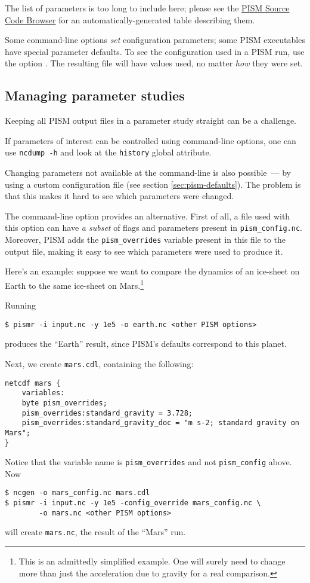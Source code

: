 The list of parameters is too long to include here; please see the \href{http://www.pism-docs.org/doxy/html/index.html}{PISM Source Code Browser} for an automatically-generated table describing them.

Some command-line options \emph{set} configuration parameters; some PISM
executables have special parameter defaults. To see the configuration used in a
PISM run, use the option . The resulting file will have values
used, no matter \emph{how} they were set.

\subsection{Managing parameter studies}
\label{sec:parameter-studies}
Keeping all PISM output files in a parameter study straight can be a challenge.

If parameters of interest can be controlled using command-line options, one can use \texttt{ncdump -h} and look at the \texttt{history} global attribute.

Changing parameters not available at the command-line is also possible~--- by using a custom configuration file (see section \ref{sec:pism-defaults}). The problem is that this makes it hard to see which parameters were changed.

The  command-line option provides an alternative. First of all, a file used with this option can have \emph{a subset} of flags and parameters present in \texttt{pism_config.nc}. Moreover, PISM adds the \texttt{pism_overrides} variable present in this file to the output file, making it easy to see which parameters were used to produce it.

Here's an example: suppose we want to compare the dynamics of an ice-sheet on Earth to the same ice-sheet on Mars.\footnote{This is an admittedly simplified example. One will surely need to change more than just the acceleration due to gravity for a real comparison.}

Running
\begin{verbatim}
$ pismr -i input.nc -y 1e5 -o earth.nc <other PISM options>
\end{verbatim}
produces the ``Earth'' result, since PISM's defaults correspond to this planet.

Next, we create \texttt{mars.cdl}, containing the following:
\small
\begin{verbatim}
netcdf mars {
    variables:
    byte pism_overrides;
    pism_overrides:standard_gravity = 3.728;
    pism_overrides:standard_gravity_doc = "m s-2; standard gravity on Mars";
}
\end{verbatim}
\normalsize
Notice that the variable name is \texttt{pism_overrides} and not \texttt{pism_config} above. Now
\begin{verbatim}
$ ncgen -o mars_config.nc mars.cdl
$ pismr -i input.nc -y 1e5 -config_override mars_config.nc \
        -o mars.nc <other PISM options>
\end{verbatim}
will create \texttt{mars.nc}, the result of the ``Mars'' run.

